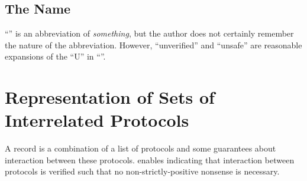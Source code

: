 \documentclass{report}
\begin{document}
\section{The Name}
``'' is an abbreviation of \emph{something}, but the author does not certainly remember the nature of the abbreviation.  However, ``unverified'' and ``unsafe'' are reasonable expansions of the ``U'' in ``''.

\chapter{Representation of Sets of Interrelated Protocols}
A  record is a combination of a list of protocols and some guarantees about interaction between these protocols.   enables indicating that interaction between protocols is verified such that no non-strictly-positive nonsense is necessary.
\end{document}
